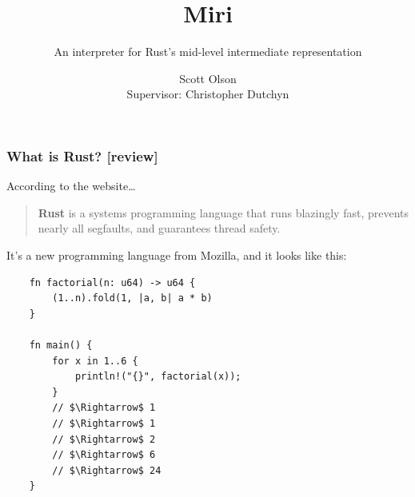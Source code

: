 \documentclass{beamer}
\title{Miri}
\subtitle{An interpreter for Rust's mid-level intermediate representation}
\author{
  Scott Olson
  \texorpdfstring{\\ \scriptsize{Supervisor: Christopher Dutchyn}}{}
}
\institute{
  CMPT 400 \\
  University of Saskatchewan
}
\date{}
\begin{document}
\maketitle

\begin{frame}[fragile]
  \frametitle{What is Rust? \small{[review]}}

  According to the website\dots

  \begin{quote}
    \textbf{Rust} is a systems programming language that runs blazingly fast,
    prevents nearly all segfaults, and guarantees thread safety.
  \end{quote}

  It's a new programming language from Mozilla, and it looks like this:

  \begin{verbatim}
    fn factorial(n: u64) -> u64 {
        (1..n).fold(1, |a, b| a * b)
    }

    fn main() {
        for x in 1..6 {
            println!("{}", factorial(x));
        }
        // $\Rightarrow$ 1
        // $\Rightarrow$ 1
        // $\Rightarrow$ 2
        // $\Rightarrow$ 6
        // $\Rightarrow$ 24
    }
  \end{verbatim}
\end{frame}
\end{document}
